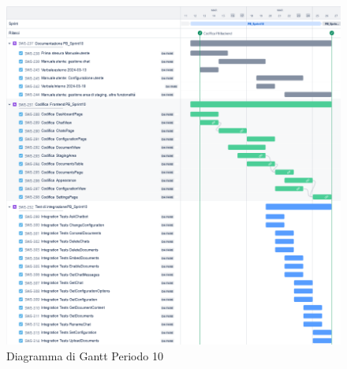 \documentclass[10pt, a4paper]{article}
\begin{document}
\begin{figure}[H]
    \centering        
    \includegraphics[width=15.5cm]{gantt/ganttPeriodo10.png}
    \caption{Diagramma di Gantt Periodo 10}
\end{figure}
\end{document}
